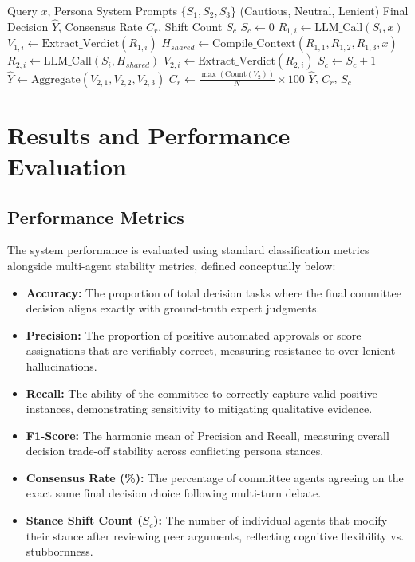 \documentclass[a4paper,fleqn]{cas-sc}
\begin{document}
\begin{algorithm}[H]
\caption{Heterogeneous Deliberative Committee Aggregation (HDCA).}
\label{alg:hdca}
\begin{algorithmic}[1]
\REQUIRE Query $x$, Persona System Prompts $\{S_1, S_2, S_3\}$ (Cautious, Neutral, Lenient)
\ENSURE Final Decision $\hat{Y}$, Consensus Rate $C_r$, Shift Count $S_c$
\STATE $S_c \leftarrow 0$
    \STATE $R_{1,i} \leftarrow \text{LLM\_Call}(S_i, x)$ 
    \STATE $V_{1,i} \leftarrow \text{Extract\_Verdict}(R_{1,i})$
\ENDFOR
\STATE $H_{shared} \leftarrow \text{Compile\_Context}(R_{1,1}, R_{1,2}, R_{1,3}, x)$
    \STATE $R_{2,i} \leftarrow \text{LLM\_Call}(S_i, H_{shared})$ 
    \STATE $V_{2,i} \leftarrow \text{Extract\_Verdict}(R_{2,i})$
        \STATE $S_c \leftarrow S_c + 1$ 
    \ENDIF
\ENDFOR
\STATE $\hat{Y} \leftarrow \text{Aggregate}(V_{2,1}, V_{2,2}, V_{2,3})$
\STATE $C_r \leftarrow \frac{\max(\text{Count}(V_2))}{N} \times 100$
\RETURN $\hat{Y}$, $C_r$, $S_c$
\end{algorithmic}
\end{algorithm}

\section{Results and Performance Evaluation}

\subsection{Performance Metrics}
The system performance is evaluated using standard classification metrics alongside multi-agent stability metrics, defined conceptually below:
\begin{itemize}
    \item \textbf{Accuracy:} The proportion of total decision tasks where the final committee decision aligns exactly with ground-truth expert judgments.
    \item \textbf{Precision:} The proportion of positive automated approvals or score assignations that are verifiably correct, measuring resistance to over-lenient hallucinations.
    \item \textbf{Recall:} The ability of the committee to correctly capture valid positive instances, demonstrating sensitivity to mitigating qualitative evidence.
    \item \textbf{F1-Score:} The harmonic mean of Precision and Recall, measuring overall decision trade-off stability across conflicting persona stances.
    \item \textbf{Consensus Rate (\%):} The percentage of committee agents agreeing on the exact same final decision choice following multi-turn debate.
    \item \textbf{Stance Shift Count ($S_c$):} The number of individual agents that modify their stance after reviewing peer arguments, reflecting cognitive flexibility vs. stubbornness.
\end{itemize}
\end{document}
